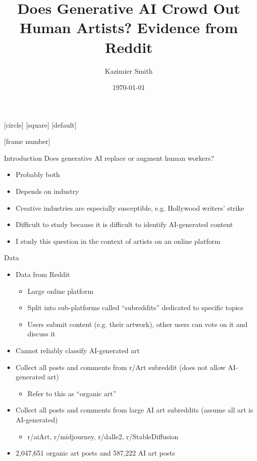 \documentclass[aspectratio=169]{beamer}
\title{Does Generative AI Crowd Out Human Artists? Evidence from Reddit}
\author{Kazimier Smith}
\date{\today}
\begin{document}
[circle]
[square]
[default]
\beamertemplatenavigationsymbolsempty

	
\begin{frame}[noframenumbering]
\titlepage
\end{frame}

[frame number]

\begin{frame}{Introduction}
Does generative AI replace or augment human workers?
	\begin{itemize}
		\item Probably both
		\item Depends on industry
		\item Creative industries are especially susceptible,
			e.g. Hollywood writers' strike
		\item Difficult to study because it is difficult to identify AI-generated content
		\item I study this question in the context of artists on an online platform
	\end{itemize}
\end{frame}

\begin{frame}{Data}
	\begin{itemize}
		\item Data from Reddit
			\begin{itemize}
				\item Large online platform
				\item Split into sub-platforms called ``subreddits'' dedicated to specific topics
				\item Users submit content (e.g. their artwork),
					other users can vote on it and discuss it
			\end{itemize}
		\item Cannot reliably classify AI-generated art
		\item Collect all posts and comments from r/Art subreddit
			(does not allow AI-generated art)
			\begin{itemize}
				\item Refer to this as ``organic art''
			\end{itemize}
		\item Collect all posts and comments from large AI art subreddits
			(assume all art is AI-generated)
		\begin{itemize}
			\item r/aiArt, r/midjourney, r/dalle2, r/StableDiffusion
		\end{itemize}
		\item 2,047,651 organic art posts and 587,222 AI art posts
	\end{itemize}
\end{frame}
\end{document}
